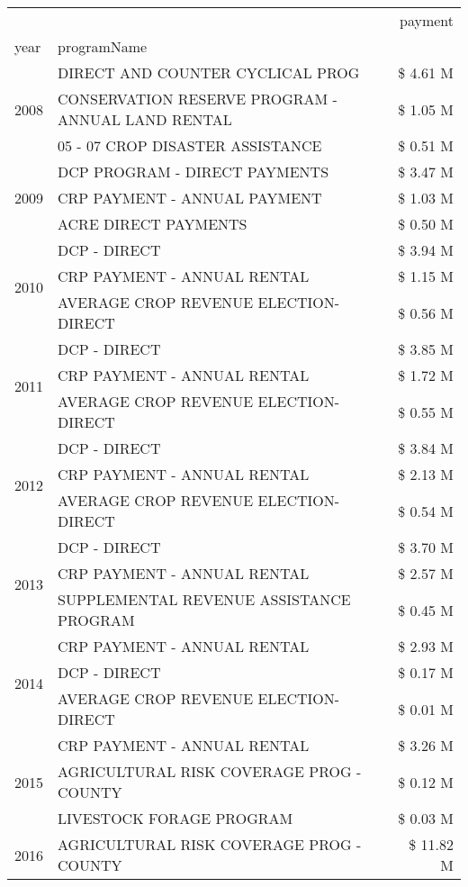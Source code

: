 \begin{tabular}{llr}
\toprule
 &  & payment \\
year & programName &  \\
\midrule
\multirow[t]{3}{*}{2008} & DIRECT AND COUNTER CYCLICAL PROG & \$ 4.61 M \\
 & CONSERVATION RESERVE PROGRAM - ANNUAL LAND RENTAL & \$ 1.05 M \\
 & 05 - 07 CROP DISASTER ASSISTANCE & \$ 0.51 M \\
\cline{1-3}
\multirow[t]{3}{*}{2009} & DCP PROGRAM - DIRECT PAYMENTS & \$ 3.47 M \\
 & CRP PAYMENT - ANNUAL PAYMENT & \$ 1.03 M \\
 & ACRE DIRECT PAYMENTS & \$ 0.50 M \\
\cline{1-3}
\multirow[t]{3}{*}{2010} & DCP - DIRECT & \$ 3.94 M \\
 & CRP PAYMENT - ANNUAL RENTAL & \$ 1.15 M \\
 & AVERAGE CROP REVENUE ELECTION-DIRECT & \$ 0.56 M \\
\cline{1-3}
\multirow[t]{3}{*}{2011} & DCP - DIRECT & \$ 3.85 M \\
 & CRP PAYMENT - ANNUAL RENTAL & \$ 1.72 M \\
 & AVERAGE CROP REVENUE ELECTION-DIRECT & \$ 0.55 M \\
\cline{1-3}
\multirow[t]{3}{*}{2012} & DCP - DIRECT & \$ 3.84 M \\
 & CRP PAYMENT - ANNUAL RENTAL & \$ 2.13 M \\
 & AVERAGE CROP REVENUE ELECTION-DIRECT & \$ 0.54 M \\
\cline{1-3}
\multirow[t]{3}{*}{2013} & DCP - DIRECT & \$ 3.70 M \\
 & CRP PAYMENT - ANNUAL RENTAL & \$ 2.57 M \\
 & SUPPLEMENTAL REVENUE ASSISTANCE PROGRAM & \$ 0.45 M \\
\cline{1-3}
\multirow[t]{3}{*}{2014} & CRP PAYMENT - ANNUAL RENTAL & \$ 2.93 M \\
 & DCP - DIRECT & \$ 0.17 M \\
 & AVERAGE CROP REVENUE ELECTION-DIRECT & \$ 0.01 M \\
\cline{1-3}
\multirow[t]{3}{*}{2015} & CRP PAYMENT - ANNUAL RENTAL & \$ 3.26 M \\
 & AGRICULTURAL RISK COVERAGE PROG - COUNTY & \$ 0.12 M \\
 & LIVESTOCK FORAGE PROGRAM & \$ 0.03 M \\
\cline{1-3}
\multirow[t]{3}{*}{2016} & AGRICULTURAL RISK COVERAGE PROG - COUNTY & \$ 11.82 M \\

\end{tabular}
